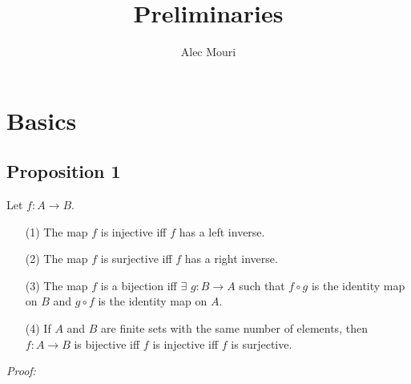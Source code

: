\documentclass[12pt]{article}
\begin{document}
\title{Preliminaries}
\author{Alec Mouri}

\maketitle
\section{Basics}
\subsection*{Proposition 1}
Let $f : A \rightarrow B$.
\begin{itemize}
\item[(1)] The map $f$ is injective iff $f$ has a left inverse.
\item[(2)] The map $f$ is surjective iff $f$ has a right inverse.
\item[(3)] The map $f$ is a bijection iff $\exists$ $g: B \rightarrow A$ such that $f \circ g$ is the identity map on $B$ and $g \circ f$ is the identity map on $A$.
\item[(4)] If $A$ and $B$ are finite sets with the same number of elements, then $f : A \rightarrow B$ is bijective iff $f$ is injective iff $f$ is surjective.
\end{itemize}
\emph{Proof:}
\end{document}
